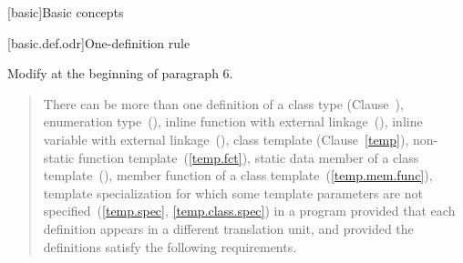 [basic]{Basic concepts}

[basic.def.odr]{One-definition rule}

Modify at the beginning of paragraph 6.

\begin{quote}
\setcounter{Paras}{5}
\pnum
There can be more than one definition of a class type
(Clause~), enumeration type~(), inline function
with external linkage~(), inline variable with external
linkage~(), class template
(Clause~\ref{temp}), non-static function template~(\ref{temp.fct}),
static data member of a class template~(), member
function of a class template~(\ref{temp.mem.func}),  template
specialization for which some template parameters are not
specified~(\ref{temp.spec}, \ref{temp.class.spec})\added{,}
 in a program provided
that each definition appears in a different translation unit, and
provided the definitions satisfy the following requirements.
\end{quote}

